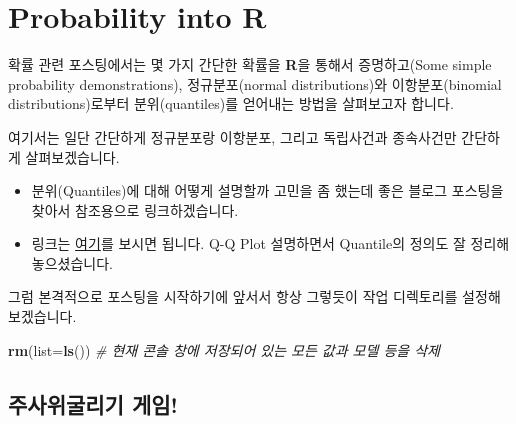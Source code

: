 \documentclass[]{book}
\newenvironment{Shaded}{\begin{snugshade}}{\end{snugshade}}
\newcommand{\CommentTok}[1]{\textcolor[rgb]{0.56,0.35,0.01}{\textit{#1}}}
\newcommand{\DataTypeTok}[1]{\textcolor[rgb]{0.13,0.29,0.53}{#1}}
\newcommand{\KeywordTok}[1]{\textcolor[rgb]{0.13,0.29,0.53}{\textbf{#1}}}
\newcommand{\NormalTok}[1]{#1}
\newcommand{\OperatorTok}[1]{\textcolor[rgb]{0.81,0.36,0.00}{\textbf{#1}}}
\newcommand{\StringTok}[1]{\textcolor[rgb]{0.31,0.60,0.02}{#1}}
\providecommand{\tightlist}{%
  \setlength{\itemsep}{0pt}\setlength{\parskip}{0pt}}
\begin{document}
\hypertarget{probability-into-r}{%
\chapter{Probability into R}\label{probability-into-r}}

확률 관련 포스팅에서는 몇 가지 간단한 확률을 \textbf{R}을 통해서 증명하고(Some simple probability demonstrations), 정규분포(normal distributions)와 이항분포(binomial distributions)로부터 분위(quantiles)를 얻어내는 방법을 살펴보고자 합니다.

여기서는 일단 간단하게 정규분포랑 이항분포, 그리고 독립사건과 종속사건만 간단하게 살펴보겠습니다.

\begin{itemize}
\tightlist
\item
  분위(Quantiles)에 대해 어떻게 설명할까 고민을 좀 했는데 좋은 블로그 포스팅을 찾아서 참조용으로 링크하겠습니다.
\item
  링크는 \href{https://blog.naver.com/sw4r/221026102874}{여기}를 보시면 됩니다. Q-Q Plot 설명하면서 Quantile의 정의도 잘 정리해놓으셨습니다.
\end{itemize}

그럼 본격적으로 포스팅을 시작하기에 앞서서 항상 그렇듯이 작업 디렉토리를 설정해보겠습니다.

\begin{Shaded}
\begin{Highlighting}[]
\KeywordTok{rm}\NormalTok{(}\DataTypeTok{list=}\KeywordTok{ls}\NormalTok{()) }\CommentTok{# 현재 콘솔 창에 저장되어 있는 모든 값과 모델 등을 삭제 }
\end{Highlighting}
\end{Shaded}

\begin{Shaded}
\end{Shaded}

\hypertarget{uxc8fcuxc0acuxc704uxad74uxb9acuxae30-uxac8cuxc784}{%
\section{주사위굴리기 게임!}\label{uxc8fcuxc0acuxc704uxad74uxb9acuxae30-uxac8cuxc784}}
\end{document}
